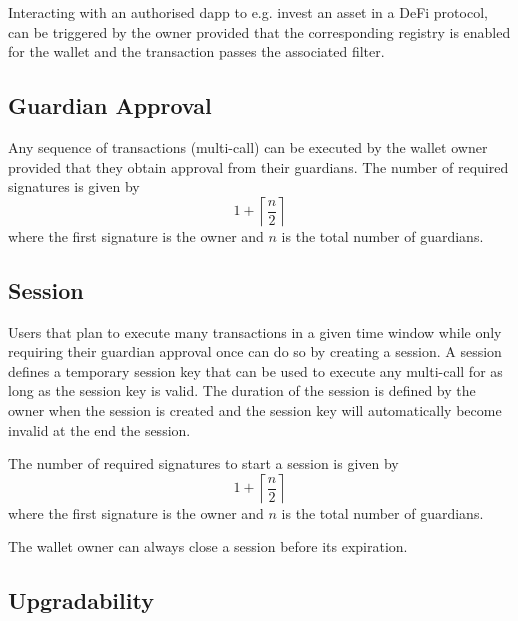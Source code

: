 \documentclass[12pt]{article}
\begin{document}
Interacting with an authorised dapp to e.g. invest an asset in a DeFi protocol, can be triggered by the owner provided that the corresponding registry is enabled for the wallet and the transaction passes the associated filter.

\subsection{Guardian Approval}
\label{sec:guardian-approval}

Any sequence of transactions (multi-call) can be executed by the wallet owner provided that they obtain approval from their guardians. The number of required signatures is given by
\begin{equation*}
    1+\left\lceil {\frac{n}{2}} \right\rceil
\end{equation*}
where the first signature is the owner and $n$ is the total number of guardians.

\subsection{Session}
\label{sec:session}

Users that plan to execute many transactions in a given time window while only requiring their guardian approval once can do so by creating a session. A session defines a temporary session key that can be used to execute any multi-call for as long as the session key is valid. The duration of the session is defined by the owner when the session is created and the session key will automatically become invalid at the end the session.

The number of required signatures to start a session is given by
\begin{equation*}
    1+\left\lceil {\frac{n}{2}} \right\rceil
\end{equation*}
where the first signature is the owner and $n$ is the total number of guardians.

The wallet owner can always close a session before its expiration.

\subsection{Upgradability}
\end{document}
